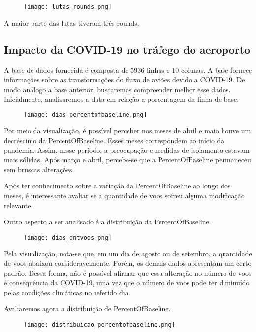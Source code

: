 \documentclass{article}
\begin{document}
\begin{figure}[H] 
    \centering 
    \texttt{[image: lutas\_rounds.png]} 
\end{figure}

\par A maior parte das lutas tiveram três rounds. 

\subsection{Impacto da COVID-19 no tráfego do aeroporto}
A base de dados fornecida é composta de 5936 linhas e 10 colunas. A base fornece informações sobre as transformações do fluxo de aviões devido a COVID-19. De modo análogo a base anterior, buscaremos compreender melhor esse dados. Inicialmente, analisaremos a data em relação a porcentagem da linha de base.

\begin{figure}[H] 
    \centering 
    \texttt{[image: dias\_percentofbaseline.png]} 
\end{figure}

Por meio da visualização, é possível perceber nos meses de abril e maio houve um decréscimo da PercentOfBaseline. Esses meses correspondem ao início da pandemia. Assim, nesse período, a preocupação e medidas de isolamento estavam mais sólidas. Após março e abril, percebe-se que a PercentOfBaseline permaneceu sem bruscas alterações. 
\par Após ter conhecimento sobre a variação da PercentOfBaseline ao longo dos meses, é interessante avaliar se a quantidade de voos sofreu alguma modificação relevante.
\par Outro aspecto a ser analisado é a distribuição da PercentOfBaseline. 

\begin{figure}[H] 
    \centering 
    \texttt{[image: dias\_qntvoos.png]} 
\end{figure}

Pela visualização, nota-se que, em um dia de agosto ou de setembro, a quantidade de voos abaixou consideravelmente. Porém, os demais dados apresentam um certo padrão. Dessa forma, não é possível afirmar que essa alteração no número de voos é consequência da COVID-19, uma vez que o número de voos pode ter diminuído pelas condições climáticas no referido dia.
\par Avaliaremos agora a distribuição de PercentOfBaseline.

\begin{figure}[H] 
    \centering 
    \texttt{[image: distribuicao\_percentofbaseline.png]} 
\end{figure}
\end{document}
